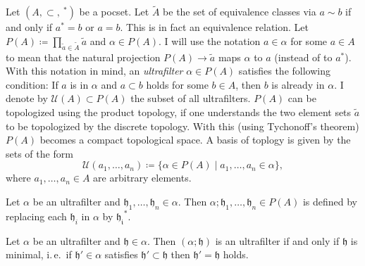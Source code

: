 \begin{defin}[Ultrafilter]
  Let \((A, \subset, \ ^\ast)\) be a pocset. Let \(\tilde A\) be the set of equivalence classes via \(a \sim b\) if and only if \(a^\ast = b\) or \(a = b\). This is in fact an equivalence relation. Let \(P(A) \coloneqq \prod_{\tilde a \in \tilde A} \tilde a\) and \(\alpha \in P(A)\). I will use the notation \(a \in \alpha\) for some \(a \in A\) to mean that the natural projection \(P(A) \to \tilde a\) maps \(\alpha\) to \(a\) (instead of to \(a^\ast\)). With this notation in mind, an \emph{ultrafilter} \(\alpha \in P(A)\) satisfies the following condition: If \(a\) is in \(\alpha\) and \(a \subset b\) holds for some \(b \in A\), then \(b\) is already in \(\alpha\). I denote by \(\mathcal{U}(A) \subset P(A)\) the subset of all ultrafilters. \(P(A)\) can be topologized using the product topology, if one understands the two element sets \(\tilde a\) to be topologized by the discrete topology. With this (using Tychonoff's theorem) \(P(A)\) becomes a compact topological space. A basis of toplogy is given by the sets of the form
\[
  \mathcal{U}(a_1,\dots, a_n) \coloneqq \{\alpha \in P(A) \mid a_1, \dots, a_n \in \alpha\},
\]
where \(a_1,\dots, a_n \in A\) are arbitrary elements.
\end{defin}

\begin{defin}
  Let \(\alpha\) be an ultrafilter and \(\mathfrak{h}_1, \dots, \mathfrak{h}_n \in \alpha\). Then \(\alpha; \mathfrak{h}_1, \dots, \mathfrak{h}_n \in P(A)\) is defined by replacing each \(\mathfrak{h}_i\) in \(\alpha\) by \(\mathfrak{h_i}^\ast\).
\end{defin}

\begin{lemma}
  Let \(\alpha\) be an ultrafilter and \(\mathfrak{h} \in \alpha\). Then \((\alpha;\mathfrak{h})\) is an ultrafilter if and only if \(\mathfrak{h}\) is minimal, i.\,e.\ if \(\mathfrak{h}' \in \alpha\) satisfies \(\mathfrak{h'} \subset \mathfrak{h}\) then \(\mathfrak{h'} = \mathfrak{h}\) holds.
\end{lemma}

